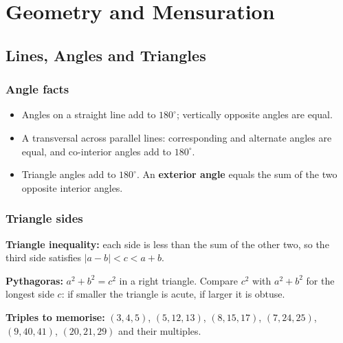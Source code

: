 \documentclass[11pt,a4paper,openany]{report}
\begin{document}
\part{Geometry and Mensuration}
\chapter{Lines, Angles and Triangles}\label{ch:tri}

\section{Angle facts}
\begin{itemize}[nosep]
\item Angles on a straight line add to $180^\circ$; vertically opposite angles are equal.
\item A transversal across parallel lines: corresponding and alternate angles are equal, and co-interior angles add to $180^\circ$.
\item Triangle angles add to $180^\circ$. An \textbf{exterior angle} equals the sum of the two opposite interior angles.
\end{itemize}

\section{Triangle sides}
\textbf{Triangle inequality:} each side is less than the sum of the other two, so the third side satisfies $|a-b|<c<a+b$.

\textbf{Pythagoras:} $a^2+b^2=c^2$ in a right triangle. Compare $c^2$ with $a^2+b^2$ for the longest side $c$: if smaller the triangle is acute, if larger it is obtuse.

\textbf{Triples to memorise:} $(3,4,5)$, $(5,12,13)$, $(8,15,17)$, $(7,24,25)$, $(9,40,41)$, $(20,21,29)$ and their multiples.

\begin{center}
\end{center}
\end{document}
